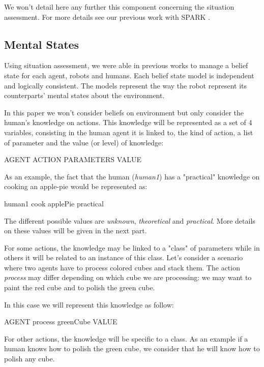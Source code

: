 \documentclass{llncs}
\begin{document}
We won't detail here any further this component concerning the situation assessment.
For more details see our previous work with SPARK \cite{Milliez2014}.

\subsection{Mental States}
Using situation assessment, we were able in previous works to manage a belief state for each agent, robots and humans. Each belief state model is independent and logically consistent. The models represent the way the robot represent its counterparts' mental states about the environment.

In this paper we won't consider beliefs on environment but only consider the human's knowledge on actions. This knowledge will be represented as a set of 4 variables, consisting in the human agent it is linked to, the kind of action, a list of parameter and the value (or level) of knowledge:

AGENT ACTION PARAMETERS VALUE

As an example, the fact that the human (\textit{human1}) has a "practical" knowledge on cooking an apple-pie would be represented as:

human1 cook applePie practical

The different possible values are \textit{unknown}, \textit{theoretical} and \textit{practical}. More details on these values will be given in the next part.

For some actions, the knowledge may be linked to a "class" of parameters while in others it will be related to an instance of this class.
Let's consider a scenario where two agents have to process colored cubes and stack them.
The action \textit{process} may differ depending on which cube we are processing: we may want to paint the red cube and to polish the green cube. %

In this case we will represent this knowledge as follow:

AGENT process greenCube VALUE

For other actions, the knowledge will be specific to a class. As an example if a human knows how to polish the green cube, we consider that he will know how to polish any cube.

\end{document}
